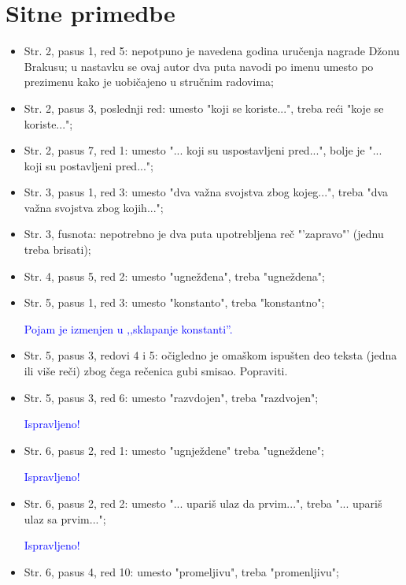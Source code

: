 \documentclass[a4paper]{report}
\newcommand{\odgovor}[1]{\textcolor{blue}{#1}}
\begin{document}
\section{Sitne primedbe}
\begin{itemize}
	\item Str. 2, pasus 1, red 5: nepotpuno je navedena godina uručenja nagrade Džonu Brakusu; u nastavku se ovaj autor dva puta navodi po imenu umesto po prezimenu kako je uobičajeno u stručnim radovima;
	\item Str. 2, pasus 3, poslednji red: umesto "koji se koriste...", treba reći "koje se koriste...";
	\item Str. 2, pasus 7, red 1: umesto "... koji su uspostavljeni pred...", bolje je "... koji su postavljeni pred..."; 
	\item Str. 3, pasus 1, red 3: umesto "dva važna svojstva zbog kojeg...", treba "dva važna svojstva zbog kojih...";
	\item Str. 3, fusnota: nepotrebno je dva puta upotrebljena reč "'zapravo"' (jednu treba brisati);
	\item Str. 4, pasus 5, red 2: umesto "ugnežđena", treba "ugneždena";
	\item Str. 5, pasus 1, red 3: umesto "konstanto", treba "konstantno";
	
	\odgovor{Pojam je izmenjen u ‚‚sklapanje konstanti''.}
	
	\item Str. 5, pasus 3, redovi 4 i 5: očigledno je omaškom ispušten deo teksta (jedna ili više reči) zbog čega rečenica gubi smisao. Popraviti.
	
	
	
	\item Str. 5, pasus 3, red 6: umesto "razvdojen", treba "razdvojen";
	
	\odgovor{Ispravljeno!}
	
	\item Str. 6, pasus 2, red 1: umesto "ugnježdene" treba "ugneždene";
	
	\odgovor{Ispravljeno!}
	
	\item Str. 6, pasus 2, red 2: umesto "... upariš ulaz da prvim...", treba "... upariš ulaz sa prvim...";
	
	\odgovor{Ispravljeno!}
	
	\item Str. 6, pasus 4, red 10: umesto "promeljivu", treba "promenljivu";
	

\end{itemize}
\end{document}
